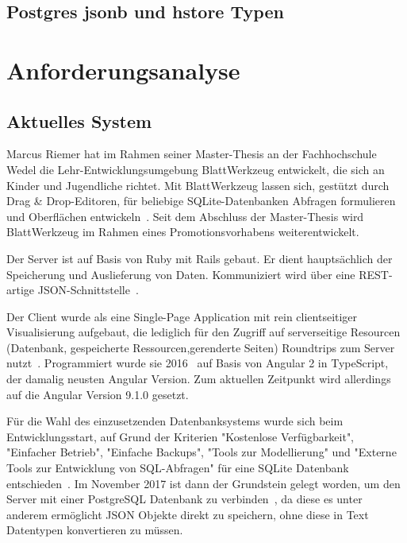 \section{Postgres jsonb und hstore Typen}

\chapter{Anforderungsanalyse}
\section{Aktuelles System}

Marcus Riemer hat im Rahmen seiner Master-Thesis an der Fachhochschule Wedel die Lehr-Entwicklungsumgebung BlattWerkzeug entwickelt,
die sich an Kinder und Jugendliche richtet. Mit BlattWerkzeug lassen sich, gestützt durch Drag \& Drop-Edi\-toren,
für beliebige SQLite-Datenbanken Abfragen formulieren und Oberflächen entwickeln~\cite[2]{riemer2016}.
Seit dem Abschluss der Master-Thesis wird BlattWerkzeug im Rahmen eines Promotionsvorhabens weiterentwickelt.

Der Server ist auf Basis von Ruby mit Rails gebaut. Er dient hauptsächlich der Speicherung und Auslieferung von Daten.
Kommuniziert wird über eine REST-artige JSON-Schnittstelle~\cite[94]{riemer2016}.

Der Client wurde als eine Single-Page Application mit rein clientseitiger Visualisierung aufgebaut,
die lediglich für den Zugriff auf serverseitige Resourcen  (Datenbank, gespeicherte Ressourcen,gerenderte Seiten) Roundtrips zum Server nutzt~\cite[94-95]{riemer2016}.
Programmiert wurde sie 2016~\cite[1]{riemer2016} auf Basis von Angular 2 in TypeScript, der damalig neusten Angular Version.
Zum aktuellen Zeitpunkt wird allerdings auf die Angular Version 9.1.0 gesetzt.


Für die Wahl des einzusetzenden Datenbanksystems wurde sich beim Entwicklungsstart, auf Grund der Kriterien "Kostenlose Verfügbarkeit",
"Einfacher Betrieb", "Einfache Backups", "Tools zur Modellierung" und "Externe Tools zur Entwicklung von SQL-Abfragen"
für eine SQLite Datenbank entschieden~\cite[99-100]{riemer2016}. Im November 2017 ist dann der Grundstein gelegt worden,
um den Server mit einer PostgreSQL Datenbank zu verbinden~\cite{riemerPostgresCommit}, da diese es unter anderem ermöglicht JSON Objekte direkt zu speichern,
ohne diese in Text Datentypen konvertieren zu müssen.
